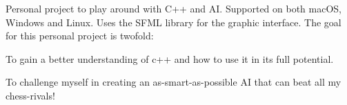 Personal project to play around with C++ and AI. Supported on both mac\+OS, Windows and Linux. Uses the S\+F\+ML library for the graphic interface. The goal for this personal project is twofold\+:
\begin{DoxyEnumerate}
\item To gain a better understanding of c++ and how to use it in it\textquotesingle{}s full potential.
\item To challenge myself in creating an as-\/smart-\/as-\/possible AI that can beat all my chess-\/rivals!
\end{DoxyEnumerate}

 